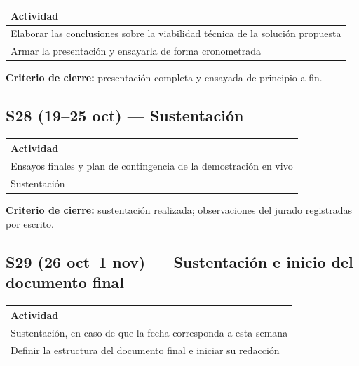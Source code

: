 \documentclass[12pt,letterpaper]{article}
\begin{document}
\begin{table}[H]
    \centering
    \small
    \begin{tabular}{@{}p{13.8cm}@{}}
        \toprule
        \textbf{Actividad} \\ \midrule
        Elaborar las conclusiones sobre la viabilidad técnica de la solución propuesta \\
        Armar la presentación y ensayarla de forma cronometrada \\ \bottomrule
    \end{tabular}
\end{table}

\textbf{Criterio de cierre:} presentación completa y ensayada de principio a fin.

\subsection{S28 (19--25 oct) --- Sustentación}

\begin{table}[H]
    \centering
    \small
    \begin{tabular}{@{}p{13.8cm}@{}}
        \toprule
        \textbf{Actividad} \\ \midrule
        Ensayos finales y plan de contingencia de la demostración en vivo \\
        Sustentación \\ \bottomrule
    \end{tabular}
\end{table}

\textbf{Criterio de cierre:} sustentación realizada; observaciones del jurado registradas por escrito.

\subsection{S29 (26 oct--1 nov) --- Sustentación e inicio del documento final}

\begin{table}[H]
    \centering
    \small
    \begin{tabular}{@{}p{13.8cm}@{}}
        \toprule
        \textbf{Actividad} \\ \midrule
        Sustentación, en caso de que la fecha corresponda a esta semana \\
        Definir la estructura del documento final e iniciar su redacción \\ \bottomrule
    \end{tabular}
\end{table}
\end{document}
